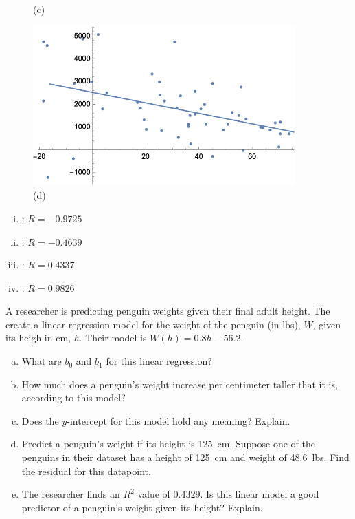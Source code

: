 \documentclass[11pt,letterpaper]{article}
\begin{document}
\begin{figure}[!ht]
\begin{minipage}{0.45\textwidth}
	   \caption*{(c)}
	\end{minipage}
	\begin{minipage}{0.45\textwidth}
	   \centering
	   \includegraphics[width=0.9\textwidth]{reg4.png}
	   \caption*{(d)}
	\end{minipage}
	\end{figure}

\begin{enumerate}[(i)]
\item \underline{\hspace{1.5cm}}: $R= -0.9725$
\item \underline{\hspace{1.5cm}}: $R= -0.4639$
\item \underline{\hspace{1.5cm}}: $R= 0.4337$
\item\underline{\hspace{1.5cm}}: $R= 0.9826$
\end{enumerate} 



\newpage



 A researcher is predicting penguin weights given their final adult height. The create a linear regression model for the weight of the penguin (in lbs), $W$, given its heigh in cm, $h$. Their model is $W(h)= 0.8h - 56.2$.
	\begin{enumerate}[(a)]
	\item What are $b_0$ and $b_1$ for this linear regression?
	\item How much does a penguin's weight increase per centimeter taller that it is, according to this model?
	\item Does the $y$-intercept for this model hold any meaning? Explain. 
	\item Predict a penguin's weight if its height is 125~cm. Suppose one of the penguins in their dataset has a height of 125~cm and weight of 48.6~lbs. Find the residual for this datapoint. 
	\item The researcher finds an $R^2$ value of $0.4329$. Is this linear model a good predictor of a penguin's weight given its height? Explain. 
	\end{enumerate}
\end{document}

